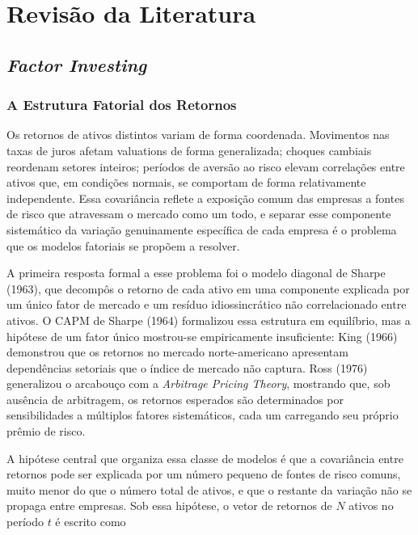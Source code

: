 \chapter{Revisão da Literatura}

\section{\textit{Factor Investing}}

\subsection{A Estrutura Fatorial dos Retornos}

Os retornos de ativos distintos variam de forma coordenada. Movimentos nas taxas de juros afetam valuations de forma generalizada; choques cambiais reordenam setores inteiros; períodos de aversão ao risco elevam correlações entre ativos que, em condições normais, se comportam de forma relativamente independente. Essa covariância reflete a exposição comum das empresas a fontes de risco que atravessam o mercado como um todo, e separar esse componente sistemático da variação genuinamente específica de cada empresa é o problema que os modelos fatoriais se propõem a resolver.

A primeira resposta formal a esse problema foi o modelo diagonal de Sharpe (1963), que decompôs o retorno de cada ativo em uma componente explicada por um único fator de mercado e um resíduo idiossincrático não correlacionado entre ativos. O CAPM de Sharpe (1964) formalizou essa estrutura em equilíbrio, mas a hipótese de um fator único mostrou-se empiricamente insuficiente: King (1966) demonstrou que os retornos no mercado norte-americano apresentam dependências setoriais que o índice de mercado não captura. Ross (1976) generalizou o arcabouço com a \textit{Arbitrage Pricing Theory}, mostrando que, sob ausência de arbitragem, os retornos esperados são determinados por sensibilidades a múltiplos fatores sistemáticos, cada um carregando seu próprio prêmio de risco.

A hipótese central que organiza essa classe de modelos é que a covariância entre retornos pode ser explicada por um número pequeno de fontes de risco comuns, muito menor do que o número total de ativos, e que o restante da variação não se propaga entre empresas. Sob essa hipótese, o vetor de retornos de $N$ ativos no período $t$ é escrito como

